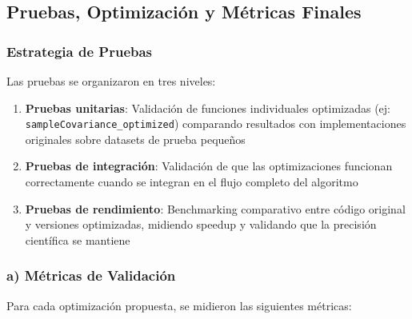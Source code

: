 \subsection{Pruebas, Optimización y Métricas Finales}

\subsubsection{Estrategia de Pruebas}

Las pruebas se organizaron en tres niveles:

\begin{enumerate}
    \item \textbf{Pruebas unitarias}: Validación de funciones individuales optimizadas (ej: \texttt{sampleCovariance\_optimized}) comparando resultados con implementaciones originales sobre datasets de prueba pequeños
    \item \textbf{Pruebas de integración}: Validación de que las optimizaciones funcionan correctamente cuando se integran en el flujo completo del algoritmo
    \item \textbf{Pruebas de rendimiento}: Benchmarking comparativo entre código original y versiones optimizadas, midiendo speedup y validando que la precisión científica se mantiene
\end{enumerate}

\subsubsection{a) Métricas de Validación}

Para cada optimización propuesta, se midieron las siguientes métricas:

